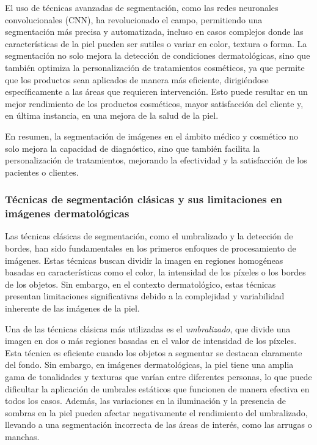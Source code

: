 El uso de técnicas avanzadas de segmentación, como las redes neuronales convolucionales (CNN), ha revolucionado el campo, permitiendo una segmentación más precisa y automatizada, incluso en casos complejos donde las características de la piel pueden ser sutiles o variar en color, textura o forma. La segmentación no solo mejora la detección de condiciones dermatológicas, sino que también optimiza la personalización de tratamientos cosméticos, ya que permite que los productos sean aplicados de manera más eficiente, dirigiéndose específicamente a las áreas que requieren intervención. Esto puede resultar en un mejor rendimiento de los productos cosméticos, mayor satisfacción del cliente y, en última instancia, en una mejora de la salud de la piel.

En resumen, la segmentación de imágenes en el ámbito médico y cosmético no solo mejora la capacidad de diagnóstico, sino que también facilita la personalización de tratamientos, mejorando la efectividad y la satisfacción de los pacientes o clientes. \parencite{mohammadi2019}
\subsubsection{Técnicas de segmentación clásicas y sus limitaciones en imágenes dermatológicas}
Las técnicas clásicas de segmentación, como el umbralizado y la detección de bordes, han sido fundamentales en los primeros enfoques de procesamiento de imágenes. Estas técnicas buscan dividir la imagen en regiones homogéneas basadas en características como el color, la intensidad de los píxeles o los bordes de los objetos. Sin embargo, en el contexto dermatológico, estas técnicas presentan limitaciones significativas debido a la complejidad y variabilidad inherente de las imágenes de la piel.

Una de las técnicas clásicas más utilizadas es el \textit{umbralizado}, que divide una imagen en dos o más regiones basadas en el valor de intensidad de los píxeles. Esta técnica es eficiente cuando los objetos a segmentar se destacan claramente del fondo. Sin embargo, en imágenes dermatológicas, la piel tiene una amplia gama de tonalidades y texturas que varían entre diferentes personas, lo que puede dificultar la aplicación de umbrales estáticos que funcionen de manera efectiva en todos los casos. Además, las variaciones en la iluminación y la presencia de sombras en la piel pueden afectar negativamente el rendimiento del umbralizado, llevando a una segmentación incorrecta de las áreas de interés, como las arrugas o manchas.

